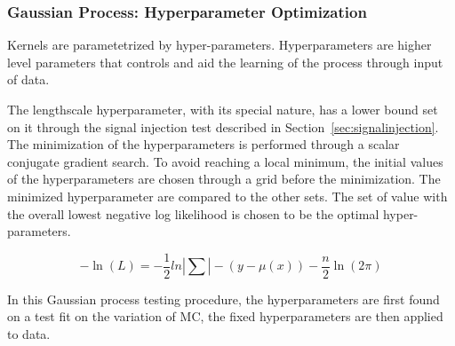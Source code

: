     \subsubsection{Gaussian Process: Hyperparameter Optimization}
    \label{sec:hyperparam}
    Kernels are parametetrized by hyper-parameters. Hyperparameters are higher level parameters that controls and aid the learning of the process through input of data. %


	The lengthscale hyperparameter, with its special nature, has a lower bound set on it through the signal injection test described in Section~\ref{sec:signalinjection}. The minimization of the hyperparameters is performed through a scalar conjugate gradient search. To avoid reaching a local minimum, the initial values of the hyperparameters are chosen through a grid before the minimization. The minimized hyperparameter are compared to the other sets. The set of value with the overall lowest negative log likelihood is chosen to be the optimal hyper-parameters.

    \begin{equation}
        -\ln(L) = -\frac{1}{2} ln |\sum| - (y-\mu(x) ) - \frac{n}{2}\ln(2\pi)
    \label{eq:loglikelihood}
    \end{equation}
    

    In this Gaussian process testing procedure, the hyperparameters are first found on a test fit on the variation of MC, the fixed hyperparameters are then applied to data.
%

